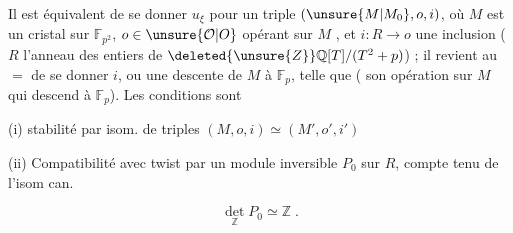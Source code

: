 
Il est équivalent de se donner  $u_\xi$ pour un triple
$(\unsure{M|M_0},o,i)$, où  $M$ est un cristal  sur $\mathbb F_{p^2}$,
$o\in\unsure{\mathcal O|O}$  opérant sur $M$ , et $i:R\to o$ une
inclusion ($R$ l'anneau des entiers de $\deleted{\unsure{Z}}\mathbb Q[T]/(T^2+p)$) ;
il revient au $=$ de se donner $i$, ou une descente  de $M$ à $\mathbb F_p$, telle que
  ( son opération sur
$M$ qui descend à $\mathbb F_p$). Les conditions sont

(i) stabilité par isom. de triples $(M,o,i)\simeq(M',o',i')$

(ii) Compatibilité avec twist par un module inversible $P_0$ sur $R$, compte tenu de l'isom can.

\[
\det_{\mathbb Z}P_0\simeq\mathbb Z\;.
\]
